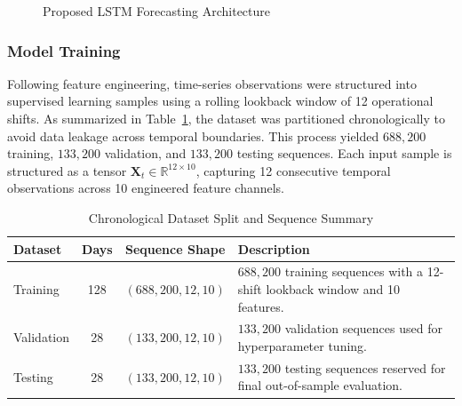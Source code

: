 \documentclass{article}
\begin{document}
\begin{figure}[htbp]
\centering
{}
\caption{Proposed LSTM Forecasting Architecture}
\label{fig:proposed_lstm_architecture}
\end{figure}

\subsubsection{Model Training}
\label{subsec:model_training}

Following feature engineering, time-series observations were structured into supervised learning samples using a rolling lookback window of 12 operational shifts.  As summarized in Table~\ref{tab:dataset_split_summary}, the dataset was partitioned chronologically to avoid data leakage across temporal boundaries. This process yielded $688,200$ training, $133,200$ validation, and $133,200$ testing sequences. Each input sample is structured as a tensor $\mathbf{X}_t \in \mathbb{R}^{12 \times 10}$, capturing 12 consecutive temporal observations across 10 engineered feature channels.
\\
\begin{table}[H]
\centering
\caption{Chronological Dataset Split and Sequence Summary}
\label{tab:dataset_split_summary}
\begin{tabularx}{\textwidth}{l c c X}
\toprule
\textbf{Dataset} & \textbf{Days} & \textbf{Sequence Shape} & \textbf{Description} \\
\midrule
Training   & 128 & $(688,200, 12, 10)$ & $688,200$ training sequences with a 12-shift lookback window and 10 features. \\
Validation &  28 & $(133,200, 12, 10)$ & $133,200$ validation sequences used for hyperparameter tuning. \\
Testing    &  28 & $(133,200, 12, 10)$ & $133,200$ testing sequences reserved for final out-of-sample evaluation. \\
\bottomrule
\end{tabularx}
\end{table}
\end{document}
